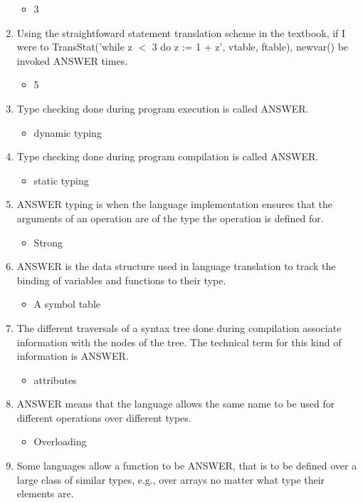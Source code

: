 \documentclass{exam}
\begin{document}
\begin{enumerate}
\begin{itemize}
\item 3
\end{itemize}
\item Using the straightfoward statement translation scheme in the textbook, if I were to TransStat('while z $<$ 3 do z := 1 + z', vtable, ftable), newvar() be invoked ANSWER times.
\begin{itemize}
\item 5
\end{itemize}
\item Type checking done during program execution is called ANSWER.
\begin{itemize}
\item dynamic typing
\end{itemize}
\item Type checking done during program compilation is called ANSWER.
\begin{itemize}
\item static typing
\end{itemize}
\item ANSWER typing is when the language implementation ensures that the arguments of an operation are of the type the operation is defined for.
\begin{itemize}
\item Strong
\end{itemize}
\item ANSWER is the data structure used in language translation to track the binding of variables and functions to their type.
\begin{itemize}
\item A symbol table
\end{itemize}
\item The different traversals of a syntax tree done during compilation associate information with the nodes of the tree.  The technical term for this kind of information is ANSWER.
\begin{itemize}
\item attributes
\end{itemize}
\item ANSWER means that the language allows the same name to be used for different operations over different types.
\begin{itemize}
\item Overloading
\end{itemize}
\item Some languages allow a function to be ANSWER, that is to be defined over a large class of similar types, e.g., over arrays no matter what type their elements are.

\end{enumerate}
\end{document}
